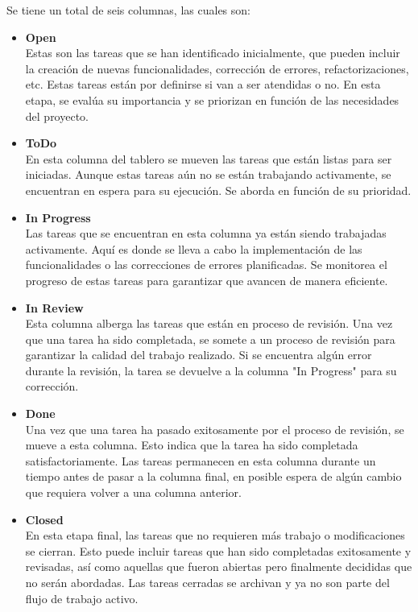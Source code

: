 Se tiene un total de seis columnas, las cuales son:
\begin{itemize}
  \item \textbf{Open} \\
  Estas son las tareas que se han identificado inicialmente, que pueden incluir la creación de nuevas funcionalidades, corrección de errores, refactorizaciones, etc. Estas tareas están por definirse si van a ser atendidas o no. En esta etapa, se evalúa su importancia y se priorizan en función de las necesidades del proyecto.
  \item \textbf{ToDo} \\
  En esta columna del tablero se mueven las tareas que están listas para ser iniciadas. Aunque estas tareas aún no se están trabajando activamente, se encuentran en espera para su ejecución. Se aborda en función de su prioridad.
  \item \textbf{In Progress} \\
  Las tareas que se encuentran en esta columna ya están siendo trabajadas activamente. Aquí es donde se lleva a cabo la implementación de las funcionalidades o las correcciones de errores planificadas. Se monitorea el progreso de estas tareas para garantizar que avancen de manera eficiente.
  \item \textbf{In Review} \\
  Esta columna alberga las tareas que están en proceso de revisión. Una vez que una tarea ha sido completada, se somete a un proceso de revisión para garantizar la calidad del trabajo realizado. Si se encuentra algún error durante la revisión, la tarea se devuelve a la columna "In Progress" para su corrección.
  \item \textbf{Done} \\
  Una vez que una tarea ha pasado exitosamente por el proceso de revisión, se mueve a esta columna. Esto indica que la tarea ha sido completada satisfactoriamente. Las tareas permanecen en esta columna durante un tiempo antes de pasar a la columna final, en posible espera de algún cambio que requiera volver a una columna anterior.
  \item \textbf{Closed} \\
  En esta etapa final, las tareas que no requieren más trabajo o modificaciones se cierran. Esto puede incluir tareas que han sido completadas exitosamente y revisadas, así como aquellas que fueron abiertas pero finalmente decididas que no serán abordadas. Las tareas cerradas se archivan y ya no son parte del flujo de trabajo activo.
\end{itemize}

